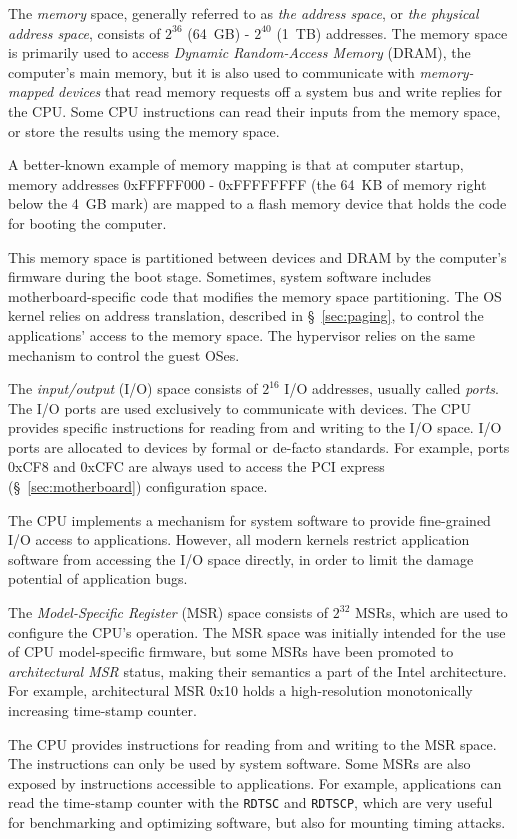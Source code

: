 The \textit{memory} space, generally referred to as \textit{the address space},
or \textit{the physical address space}, consists of $2^{36}$ (64~GB) - $2^{40}$
(1~TB) addresses. The memory space is primarily used to access \textit{Dynamic
Random-Access Memory} (DRAM), the computer's main memory, but it is also used
to communicate with \textit{memory-mapped devices} that read memory requests
off a system bus and write replies for the CPU. Some CPU instructions can read
their inputs from the memory space, or store the results using the memory
space.

A better-known example of memory mapping is that at computer startup, memory
addresses 0xFFFFF000 - 0xFFFFFFFF (the 64~KB of memory right below the 4~GB
mark) are mapped to a flash memory device that holds the code for booting the
computer.

This memory space is partitioned between devices and DRAM by the computer's
firmware during the boot stage. Sometimes, system software includes
motherboard-specific code that modifies the memory space partitioning. The OS
kernel relies on address translation, described in \S~\ref{sec:paging}, to
control the applications' access to the memory space. The hypervisor relies on
the same mechanism to control the guest OSes.


The \textit{input/output} (I/O) space consists of $2^{16}$ I/O addresses,
usually called \textit{ports}. The I/O ports are used exclusively to
communicate with devices. The CPU provides specific instructions for reading
from and writing to the I/O space. I/O ports are allocated to devices by formal
or de-facto standards. For example, ports 0xCF8 and 0xCFC are always used to
access the PCI express (\S~\ref{sec:motherboard}) configuration space.

The CPU implements a mechanism for system software to provide fine-grained I/O
access to applications. However, all modern kernels restrict application
software from accessing the I/O space directly, in order to limit the damage
potential of application bugs.


The \textit{Model-Specific Register} (MSR) space consists of $2^{32}$ MSRs,
which are used to configure the CPU's operation. The MSR space was initially
intended for the use of CPU model-specific firmware, but some MSRs have been
promoted to \textit{architectural MSR} status, making their semantics a part of
the Intel architecture. For example, architectural MSR 0x10 holds a
high-resolution monotonically increasing time-stamp counter.

The CPU provides instructions for reading from and writing to the MSR space.
The instructions can only be used by system software. Some MSRs are also
exposed by instructions accessible to applications. For example, applications
can read the time-stamp counter with the \texttt{RDTSC} and \texttt{RDTSCP},
which are very useful for benchmarking and optimizing software, but also for
mounting timing attacks.
